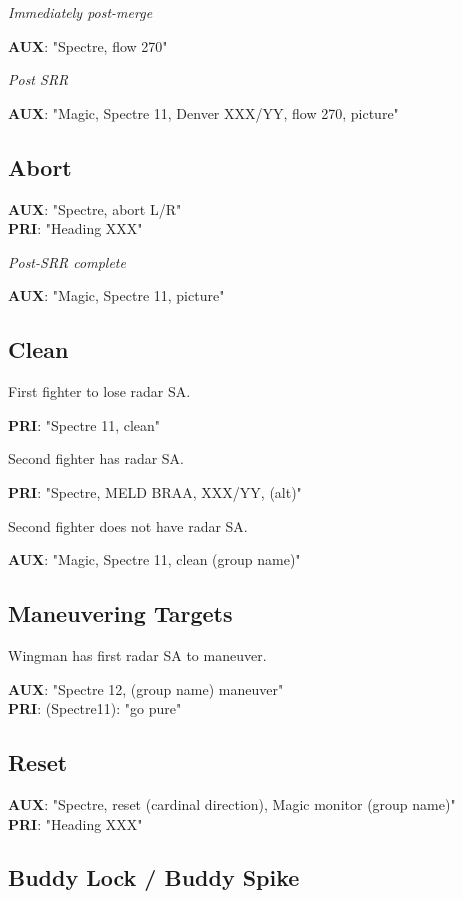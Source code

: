 \textit{Immediately post-merge}

\textbf{AUX}: "Spectre, flow 270"

\textit{Post SRR}

\textbf{AUX}: "Magic, Spectre 11, Denver XXX/YY, flow 270, picture"


\newpage

\subsection*{Abort}

\textbf{AUX}: "Spectre, abort L/R"\\
\textbf{PRI}: "Heading XXX"

\textit{Post-SRR complete}

\textbf{AUX}: "Magic, Spectre 11, picture"

\subsection*{Clean}

First fighter to lose radar SA.

\textbf{PRI}: "Spectre 11, clean"

Second fighter has radar SA.

\textbf{PRI}: "Spectre, MELD BRAA, XXX/YY, (alt)"

Second fighter does not have radar SA.

\textbf{AUX}: "Magic, Spectre 11, clean (group name)"

\subsection{Maneuvering Targets}

Wingman has first radar SA to maneuver.

\textbf{AUX}: "Spectre 12, (group name) maneuver" \\
\textbf{PRI}: (Spectre11): "go pure"

\subsection*{Reset}

\textbf{AUX}: "Spectre, reset (cardinal direction), Magic monitor (group name)"
\\
\textbf{PRI}: "Heading XXX"

\subsection*{Buddy Lock / Buddy Spike}

